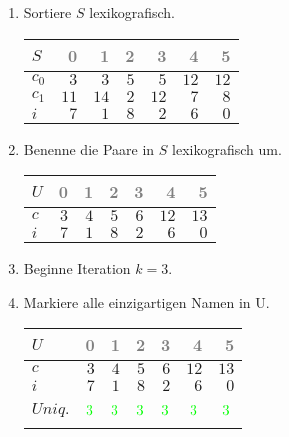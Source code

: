 \begin{enumerate}
\item 
Sortiere $S$ lexikografisch.
\begin{center}
\small\begin{tabular}{lrrrrrr}
    \toprule 
    $S$ & \textcolor{gray}{0} & \textcolor{gray}{1} & \textcolor{gray}{2} & \textcolor{gray}{3} & \textcolor{gray}{4} & \textcolor{gray}{5}\\
    \midrule 
    $c_0$ & $3$ & $3$ & $5$ & $5$ & $12$ & $12$ \\
    $c_1$ & $11$ & $14$ & $2$ & $12$ & $7$ & $8$ \\
    $i$ & $7$ & $1$ & $8$ & $2$ & $6$ & $0$ \\
    \bottomrule 
\end{tabular}
\end{center}

\item 
Benenne die Paare in $S$ lexikografisch um.
\begin{center}
\small\begin{tabular}{lrrrrrr}
    \toprule 
    $U$ & \textcolor{gray}{0} & \textcolor{gray}{1} & \textcolor{gray}{2} & \textcolor{gray}{3} & \textcolor{gray}{4} & \textcolor{gray}{5}\\
    \midrule 
    $c$ & $3$ & $4$ & $5$ & $6$ & $12$ & $13$ \\
    $i$ & $7$ & $1$ & $8$ & $2$ & $6$ & $0$ \\
    \bottomrule 
\end{tabular}
\end{center}
\item 
Beginne Iteration $k = 3$.

\item 
Markiere alle einzigartigen Namen in U.
\begin{center}
\small\begin{tabular}{lrrrrrr}
    \toprule 
    $U$ & \textcolor{gray}{0} & \textcolor{gray}{1} & \textcolor{gray}{2} & \textcolor{gray}{3} & \textcolor{gray}{4} & \textcolor{gray}{5}\\
    \midrule 
    $c$ & $3$ & $4$ & $5$ & $6$ & $12$ & $13$ \\
    $i$ & $7$ & $1$ & $8$ & $2$ & $6$ & $0$ \\
    $Uniq.$ & $$\cmarkc$$ & $$\cmarkc$$ & $$\cmarkc$$ & $$\cmarkc$$ & $$\cmarkc$$ & $$\cmarkc$$ \\
    \bottomrule 
\end{tabular}
\end{center}


\end{enumerate}
